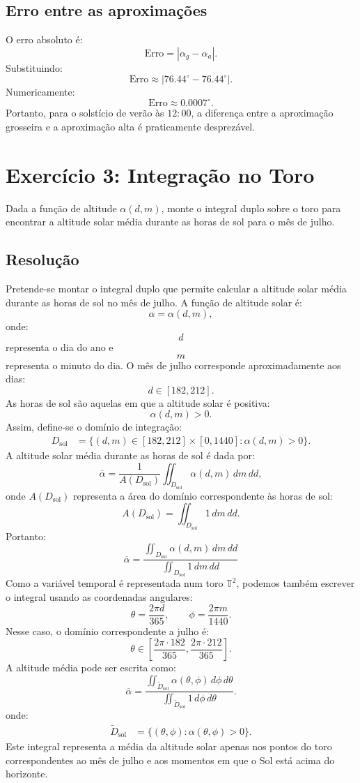 \documentclass[12pt,a4paper]{report}
\begin{document}
\subsection*{Erro entre as aproximações}
O erro absoluto é:
\[
\text{Erro}=|\alpha_g-\alpha_a|.
\]
Substituindo:
\[
\text{Erro}\approx |76.44^\circ-76.44^\circ|.
\]
Numericamente:
\[
\text{Erro}\approx 0.0007^\circ.
\]
Portanto, para o solstício de verão às \(12:00\), a diferença entre a aproximação grosseira e a aproximação alta é praticamente desprezável.
\newpage
\section{Exercício 3: Integração no Toro}
Dada a função de altitude $\alpha(d, m)$, monte o integral duplo sobre o toro para encontrar a altitude solar média durante as horas de sol para o mês de julho.

\subsection{Resolução}
Pretende-se montar o integral duplo que permite calcular a altitude solar média durante as horas de sol no mês de julho.
A função de altitude solar é:
\[
\alpha=\alpha(d,m),
\]
onde:
\[
d
\]
representa o dia do ano e
\[
m
\]
representa o minuto do dia.
O mês de julho corresponde aproximadamente aos dias:
\[
d\in[182,212].
\]
As horas de sol são aquelas em que a altitude solar é positiva:
\[
\alpha(d,m)>0.
\]
Assim, define-se o domínio de integração:
\[
\begin{aligned}
D_{\text{sol}}
&=
\{(d,m)\in[182,212]\times[0,1440] : \alpha(d,m)>0\}.
\end{aligned}
\]
A altitude solar média durante as horas de sol é dada por:
\[
\overline{\alpha}
=
\frac{1}{A(D_{\text{sol}})}
\iint_{D_{\text{sol}}} \alpha(d,m)\,dm\,dd,
\]
onde \(A(D_{\text{sol}})\) representa a área do domínio correspondente às horas de sol:
\[
A(D_{\text{sol}})
=
\iint_{D_{\text{sol}}} 1\,dm\,dd.
\]
Portanto:
\[
\boxed{
\overline{\alpha}
=
\frac{
\displaystyle \iint_{D_{\text{sol}}} \alpha(d,m)\,dm\,dd
}{
\displaystyle \iint_{D_{\text{sol}}} 1\,dm\,dd
}
}
\]
Como a variável temporal é representada num toro \(\mathbb{T}^2\), podemos também escrever o integral usando as coordenadas angulares:
\[
\theta=\frac{2\pi d}{365},
\qquad
\phi=\frac{2\pi m}{1440}.
\]
Nesse caso, o domínio correspondente a julho é:
\[
\theta\in
\left[
\frac{2\pi\cdot 182}{365},
\frac{2\pi\cdot 212}{365}
\right].
\]
A altitude média pode ser escrita como:
\[
\overline{\alpha}
=
\frac{
\displaystyle \iint_{\widetilde{D}_{\text{sol}}}
\alpha(\theta,\phi)\,d\phi\,d\theta
}{
\displaystyle \iint_{\widetilde{D}_{\text{sol}}}
1\,d\phi\,d\theta
}.
\]
onde:
\[
\begin{aligned}
\widetilde{D}_{\text{sol}}
&=
\{(\theta,\phi): \alpha(\theta,\phi)>0\}.
\end{aligned}
\]
Este integral representa a média da altitude solar apenas nos pontos do toro correspondentes ao mês de julho e aos momentos em que o Sol está acima do horizonte.
\end{document}
